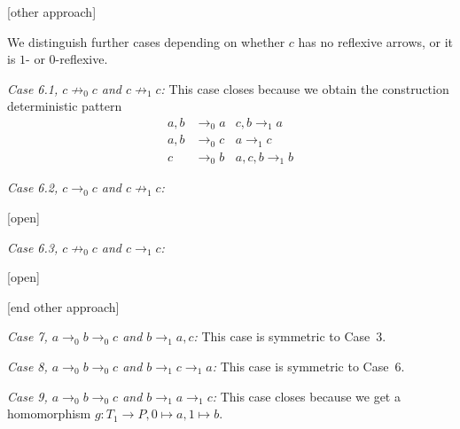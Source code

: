 \documentclass[a4paper]{article}
\newcommand{\case}[2]{\vspace{1ex}\noindent\textit{Case #1, #2:}}
\begin{document}
[other approach]

We distinguish
further cases depending on whether $c$ has no reflexive arrows, or it
is $1$- or $0$-reflexive.

\case{6.1}{$c \not \rightarrow_0 c$ and $c \not \rightarrow_1 c$}
This case closes because we obtain the construction deterministic pattern
\begin{align*}
 a,b & \rightarrow_0 a & c,b \rightarrow_1 a \\
 a,b & \rightarrow_0 c & a \rightarrow_1 c \\
 c & \rightarrow_0 b & a,c,b \rightarrow_1 b
\end{align*}

\case{6.2}{$c \rightarrow_0 c$ and $c \not \rightarrow_1 c$}

[open]

\case{6.3}{$c \not \rightarrow_0 c$ and $c \rightarrow_1 c$}

[open]

[end other approach]

\case{7}{$a \rightarrow_0 b \rightarrow_0 c$ and $b \rightarrow_1 a,c$}
This case is symmetric to Case~3.

\case{8}{$a \rightarrow_0 b \rightarrow_0 c$ and $b \rightarrow_1 c
\rightarrow_1 a$}
This case is symmetric to Case~6.

\case{9}{$a \rightarrow_0 b \rightarrow_0 c$ and $b \rightarrow_1 a
\rightarrow_1 c$} This case closes because we get a homomorphism $g :
T_1 \to P, 0 \mapsto a, 1 \mapsto b$.
\end{document}
